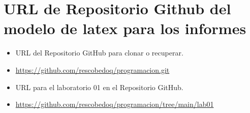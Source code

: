 \section{URL de Repositorio Github del modelo de latex para los informes}
\begin{itemize}
	\item URL del Repositorio GitHub para clonar o recuperar.
	\item \url{https://github.com/rescobedoq/programacion.git}
	\item URL para el laboratorio 01 en el Repositorio GitHub.
	\item \url{https://github.com/rescobedoq/programacion/tree/main/lab01}
\end{itemize}